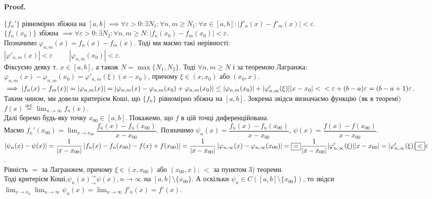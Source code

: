 \documentclass[a4paper, 10pt]{article}
\makeatletter
\def\huge{\displaystyle}
\def\qed{$\blacksquare$}
\theoremstyle{theoremdd}
\theoremstyle{theoremdd}
\theoremstyle{theoremdd}
\theoremstyle{theoremdd}
\theoremstyle{theoremdd}
\theoremstyle{theoremdd}
\theoremstyle{theoremdd}
\theoremstyle{theoremdd}
\theoremstyle{theoremdd}
\renewenvironment{proof}[1][Proof.\\]{\par
\pushQED{\hfill \qed}%
\normalfont \topsep6\p@\@plus6\p@\relax
\trivlist
\item\relax
{\bfseries
#1\@addpunct{.}}\hspace\labelsep\ignorespaces
}{%
\popQED\endtrivlist\@endpefalse
}
\makeatother
\begin{document}
\begin{proof}
$\{f_n'\}$ рівномірно збіжна на $[a,b] \implies \forall \varepsilon > 0: \exists N_1: \forall n,m \geq N_1: \forall x \in [a,b]: |f'_n(x) - f'_m(x)| < \varepsilon$.\\
$\{f_n(x_0)\}$ збіжна $\implies \forall \varepsilon > 0: \exists N_2: \forall n,m \geq N: |f_n(x_0) - f_m(x_0)| < \varepsilon$.\\
Позначимо $\varphi_{n,m}(x) = f_n(x) - f_m(x)$. Тоді ми маємо такі нерівності:\\
$|\varphi'_{n,m}(x)| < \varepsilon \hspace{1cm} |\varphi_{n,m}(x_0)| < \varepsilon$.\\
Фіксуємо деяку т. $x \in [a,b]$, а також $N = \max \{ N_1, N_2 \}$. Тоді $\forall n,m \geq N$ і за теоремою Лагранжа: $\varphi_{n,m}(x) - \varphi_{n,m}(x_0) = \varphi'_{n,m}(\xi) (x-x_0)$, причому $\xi \in (x,x_0)$ або $(x_0,x)$.\\
$\implies |f_n(x) - f_m(x)| = |\varphi_{n,m}(x)| = |\varphi_{n,m}(x) - \varphi_{n,m}(x_0) + \varphi_{n,m}(x_0)| \leq |\varphi_{n,m}(x_0)| + |\varphi'_{n,m}(\xi)| |x-x_0| < \\ < \varepsilon + (b-a)\varepsilon = (b-a+1)\varepsilon$.\\
Таким чином, ми довели критерієм Коші, що $\{f_n\}$ рівномірно збіжна на $[a,b]$. Зокрема звідси визначаємо функцію (як в теоремі) $f(x) \overset{\text{def.}}{=} \displaystyle\lim_{n \to \infty} f_n(x)$.
\bigskip \\
Далі беремо будь-яку точку $x_{00} \in [a,b]$. Покажемо, що $f$ в цій точці диференційована.\\
Маємо $f_n'(x_{00}) = \huge\lim_{x \to x_{00}} \dfrac{f_n(x) - f_n(x_{00})}{x-x_{00}}$. Позначимо $\psi_n(x) = \dfrac{f_n(x)-f_n(x_{00})}{x-x_{00}}$, $\psi(x) = \dfrac{f(x)-f(x_{00})}{x-x_{00}}$.\\
$|\psi_n(x) - \psi(x)| = \dfrac{1}{|x-x_{00}|} \left| f_n(x) - f_n(x_{00}) - f(x) + f(x_{00}) \right| = \dfrac{1}{|x-x_{00}|} \left| \varphi_{n,\infty}(x) - \varphi_{n,\infty}(x_{00}) \right| = \\ \boxed{=} \dfrac{1}{|x-x_{00}|} |\varphi_{n,\infty}'(\xi)| |x-x_{00}| = |\varphi_{n,\infty}'(\xi)| \boxed{<} \varepsilon$.\\

Рівність $\boxed{=}$ за Лагранжем, причому $\xi \in (x,x_{00})$ або $(x_{00},x)$; $\boxed{<}$ за пунктом 3) теореми.\\
Тоді  критерієм Коші,\fi $\psi_n(x)^\rightarrow_\rightarrow \psi(x), n \to \infty$ на $[a,b] \setminus \{x_{00}\}$. А оскільки $\psi_n \in C([a,b] \setminus \{x_{00}\})$, то звідси \\
 $\huge \lim_{x \to x_0} \lim_{n \to \infty} \psi_n(x) = \lim_{n \to \infty} f'_n(x) = f'(x)$.
\end{proof}
\end{document}
